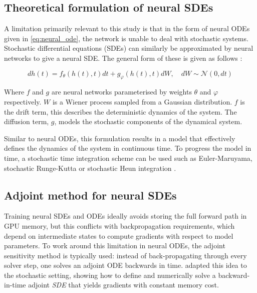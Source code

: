 \subsection{Theoretical formulation of neural SDEs}
\label{subsec:neural_sde_theory}
A limitation primarily relevant to this study is that in the form of neural ODEs given in \eqref{eq:neural_ode}, the network is unable
to deal with stochastic systems. Stochastic differential equations (SDEs) can similarly be approximated by neural
networks to give a neural SDE. The general form of these is given as follows \parencites{jiaNeuralJumpStochastic2020}{liuHowDoesNoise2020}{tzenNeuralStochasticDifferential2019}:

\begin{equation}
    dh(t) = f_\theta(h(t), t) dt + g_\varphi(h(t), t) dW, \quad dW \sim \mathcal{N}(0, dt)
\end{equation}

Where \(f\) and \(g\) are neural networks parameterised by weights \(\theta\) and \(\varphi\) respectively. \(W\) is a
Wiener process sampled from a Gaussian distribution. \(f\) is the drift term, this describes the deterministic dynamics
of the system. The diffusion term, \(g\), models the stochastic components of the dynamical system. 

Similar to neural ODEs, this formulation results in a model that effectively defines the dynamics of the system in
continuous time. To progress the model in time, a stochastic time integration scheme can be used such as Euler-Maruyama,
stochastic Runge-Kutta or stochastic Heun integration \parencite{kidgerEfficientAccurateGradients2021}.

\subsection{Adjoint method for neural SDEs}
\label{subsec:adjoint_sde}

Training neural SDEs and ODEs ideally avoids storing the full forward path in GPU memory, but this conflicts with
backpropagation requirements, which depend on intermediate states to compute gradients with respect to model parameters.
To work around this limitation in neural ODEs, the adjoint sensitivity method is typically used: instead of
back-propagating through every solver step, one solves an adjoint ODE backwards in
time.\parencite{chenNeuralOrdinaryDifferential2018} \textcite{liScalableGradientsStochastic2020} adapted this idea to
the stochastic setting, showing how to define and numerically solve a backward-in-time adjoint \emph{SDE} that yields
gradients with constant memory cost.

